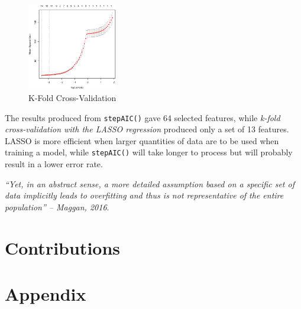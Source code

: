 \documentclass[a4paper, twocolumn]{article}
\begin{document}
    \begin{figure}[h]
        \centering
        \caption{K-Fold Cross-Validation}
        \label{fig:kfold}
        \includegraphics[width=0.35\textwidth]{share/kfold.eps}
    \end{figure}

    The results produced from \texttt{stepAIC()} gave 64 selected features, while \emph{k-fold cross-validation with the LASSO regression} produced only a set of 13 features. LASSO is more efficient when larger quantities of data are to be used when training a model, while \texttt{stepAIC()} will take longer to process but will probably result in a lower error rate.

    \emph{``Yet, in an abstract sense, a more detailed assumption based on a specific set of data implicitly leads to overfitting and thus is not representative of the entire population'' -- Maggan, 2016}.

    \section*{Contributions}

    \nocite{*} %
    
    
    \onecolumn \appendix
    \section*{Appendix}
\end{document}
